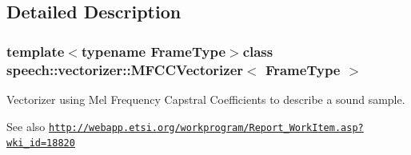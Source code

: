 \subsection{Detailed Description}
\subsubsection*{template$<$typename Frame\+Type$>$class speech\+::vectorizer\+::\+M\+F\+C\+C\+Vectorizer$<$ Frame\+Type $>$}

Vectorizer using Mel Frequency Capstral Coefficients to describe a sound sample. \begin{DoxySeeAlso}{See also}
\href{http://webapp.etsi.org/workprogram/Report_WorkItem.asp?wki_id=18820}{\tt http\+://webapp.\+etsi.\+org/workprogram/\+Report\+\_\+\+Work\+Item.\+asp?wki\+\_\+id=18820} 
\end{DoxySeeAlso}


